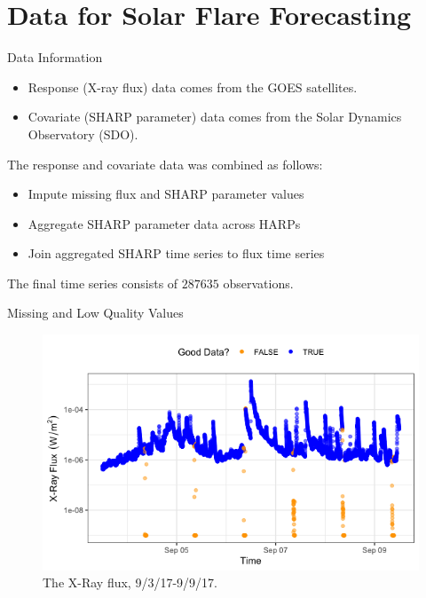 \documentclass{beamer}
\begin{document}
\section{Data for Solar Flare Forecasting}

\begin{frame}{Data Information}
    \begin{itemize}
        \item Response (X-ray flux) data comes from the GOES satellites.
        \item Covariate (SHARP parameter) data comes from the Solar Dynamics Observatory (SDO).
    \end{itemize}

    The response and covariate data was combined as follows:
    \begin{itemize}
        \item Impute missing flux and SHARP parameter values
        \item Aggregate SHARP parameter data across HARPs 
        \item Join aggregated SHARP time series to flux time series
    \end{itemize}
    The final time series consists of $\num[group-separator={,}]{287635}$ observations.
\end{frame}

\begin{frame}{Missing and Low Quality Values}
    \begin{figure}
        \centering
        \includegraphics[scale=0.5]{flux_20170906.png}
        \caption{The X-Ray flux, 9/3/17-9/9/17.}
        \label{fig:flux_20170906}
    \end{figure}
\end{frame}
\end{document}
